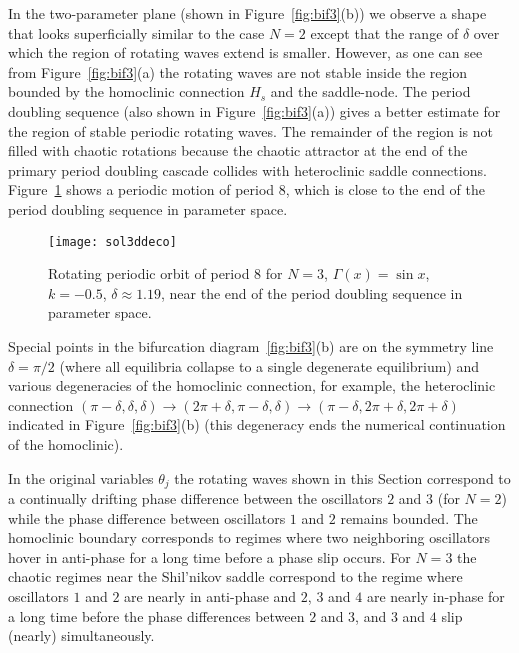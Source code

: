 \documentclass[aps,pre,twocolumn,a4paper,showkeys,showpacs]{revtex4}\usepackage{color}
\theoremstyle{plain}
\theoremstyle{plain}
\begin{document}
In the two-parameter plane (shown in Figure~\ref{fig:bif3}(b)) we observe a
shape that looks superficially similar to the case $N=2$ except that the range
of $\delta$ over which the region of rotating waves extend is smaller.
However, as one can see from Figure~\ref{fig:bif3}(a) the rotating waves are
not stable inside the region bounded by the homoclinic connection $H_{s}$ and
the saddle-node. The period doubling sequence (also shown in
Figure~\ref{fig:bif3}(a)) gives a better estimate for the region of stable
periodic rotating waves. The remainder of the region is not filled with
chaotic rotations because the chaotic attractor at the end of the primary
period doubling cascade collides with heteroclinic saddle connections.
Figure~\ref{fig:phas3} shows a periodic motion of period $8$, which is close
to the end of the period doubling sequence in parameter space.

\begin{figure}[ptb]
\texttt{[image: sol3ddeco]}\caption{Rotating periodic
orbit of period $8$ for $N=3$, $\Gamma(x)=\sin x$, $k=-0.5$, $\delta
\approx1.19$, near the end of the period doubling sequence in parameter space.
}\label{fig:phas3}\end{figure}

Special points in the bifurcation diagram~\ref{fig:bif3}(b) are on the
symmetry line $\delta=\pi/2$ (where all equilibria collapse to a single
degenerate equilibrium) and various degeneracies of the homoclinic connection,
for example, the heteroclinic connection $(\pi-\delta,\delta,\delta)\to
(2\pi+\delta,\pi-\delta,\delta)\to(\pi-\delta,2\pi+\delta,2\pi+\delta)$
indicated in Figure~\ref{fig:bif3}(b) (this degeneracy ends the numerical
continuation of the homoclinic).

In the original variables $\theta_{j}$ the rotating waves shown in this
Section correspond to a continually drifting phase difference between the
oscillators $2$ and $3$ (for $N=2$) while the phase difference between
oscillators $1$ and $2$ remains bounded. The homoclinic boundary corresponds
to regimes where two neighboring oscillators hover in anti-phase for a long
time before a phase slip occurs. For $N=3$ the chaotic regimes near the
Shil'nikov saddle correspond to the regime where oscillators $1$ and $2$ are
nearly in anti-phase and $2$, $3$ and $4$ are nearly in-phase for a long time
before the phase differences between $2$ and $3$, and $3$ and $4$ slip
(nearly) simultaneously.
\end{document}
